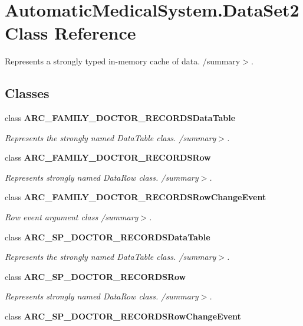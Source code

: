 \section{AutomaticMedicalSystem.DataSet2 Class Reference}
\label{class_automatic_medical_system_1_1_data_set2}
Represents a strongly typed in-memory cache of data. /summary$>$.  


\subsection*{Classes}
\begin{CompactItemize}
\item 
class {\bf ARC\_\-FAMILY\_\-DOCTOR\_\-RECORDSDataTable}
\begin{CompactList}\small\item\em Represents the strongly named DataTable class. /summary$>$. \item\end{CompactList}\item 
class {\bf ARC\_\-FAMILY\_\-DOCTOR\_\-RECORDSRow}
\begin{CompactList}\small\item\em Represents strongly named DataRow class. /summary$>$. \item\end{CompactList}\item 
class {\bf ARC\_\-FAMILY\_\-DOCTOR\_\-RECORDSRowChangeEvent}
\begin{CompactList}\small\item\em Row event argument class /summary$>$. \item\end{CompactList}\item 
class {\bf ARC\_\-SP\_\-DOCTOR\_\-RECORDSDataTable}
\begin{CompactList}\small\item\em Represents the strongly named DataTable class. /summary$>$. \item\end{CompactList}\item 
class {\bf ARC\_\-SP\_\-DOCTOR\_\-RECORDSRow}
\begin{CompactList}\small\item\em Represents strongly named DataRow class. /summary$>$. \item\end{CompactList}\item 
class {\bf ARC\_\-SP\_\-DOCTOR\_\-RECORDSRowChangeEvent}

\end{CompactItemize}
